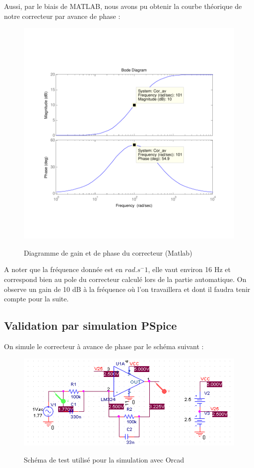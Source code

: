 \documentclass[11pt, french]{article} %
\begin{document}
Aussi, par le biais de MATLAB, nous avons pu obtenir la courbe théorique de notre correcteur par avance de phase :
\begin{figure}[!h]
    \centering
	\includegraphics[scale = 0.95]{SolutionAnalogique/BodeAvPhase.pdf} 
	\label{avph_bode}
	\caption{Diagramme de gain et de phase du correcteur (Matlab)}
\end{figure}

A noter que la fréquence donnée est en $rad.s^-1$, elle vaut environ 16 Hz et correspond bien au pole du correcteur calculé lors de la partie automatique. On observe un gain de 10 dB à la fréquence où l'on travaillera et dont il faudra tenir compte pour la suite. 

\subsection{Validation par simulation PSpice}

On simule le correcteur à avance de phase par le schéma suivant : 

\begin{figure}[!h]
    \centering
	\includegraphics[scale = 0.9]{SolutionAnalogique/orcad_sch.png} 
	\label{avph_schm_simu}
	\caption{Schéma de test utilisé pour la simulation avec Orcad}
\end{figure}
\end{document}
